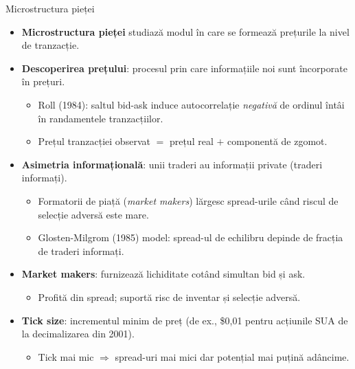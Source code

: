 \documentclass[9pt, aspectratio=169, t]{beamer}
\theoremstyle{definition}
\begin{document}
\begin{frame}{Microstructura pieței}
\begin{itemize}
    \item \textbf{Microstructura pieței} studiază modul în care se formează prețurile la nivel de tranzacție.
    \item \textbf{Descoperirea prețului}: procesul prin care informațiile noi sunt încorporate în prețuri.
    \begin{itemize}
        \item Roll (1984): saltul bid-ask induce autocorrelație \textit{negativă} de ordinul întâi în randamentele tranzacțiilor.
        \item Prețul tranzacției observat $= $ prețul real $+$ componentă de zgomot.
    \end{itemize}
    \item \textbf{Asimetria informațională}: unii traderi au informații private (traderi informați).
    \begin{itemize}
        \item Formatorii de piață (\textit{market makers}) lărgesc spread-urile când riscul de selecție adversă este mare.
        \item Glosten-Milgrom (1985) model: spread-ul de echilibru depinde de fracția de traderi informați.
    \end{itemize}
    \item \textbf{Market makers}: furnizează lichiditate cotând simultan bid și ask.
    \begin{itemize}
        \item Profită din spread; suportă risc de inventar și selecție adversă.
    \end{itemize}
    \item \textbf{Tick size}: incrementul minim de preț (de ex., \$0,01 pentru acțiunile SUA de la decimalizarea din 2001).
    \begin{itemize}
        \item Tick mai mic $\Rightarrow$ spread-uri mai mici dar potențial mai puțină adâncime.
    \end{itemize}
\end{itemize}
\end{frame}
\end{document}
